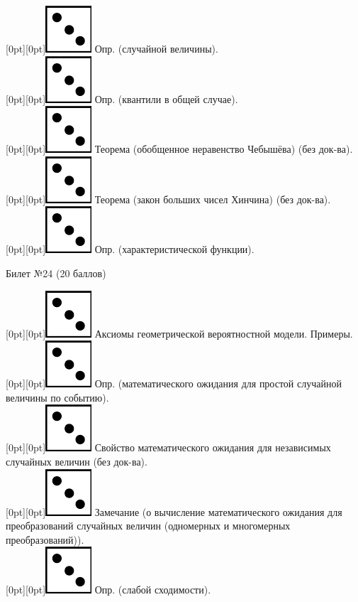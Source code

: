 \documentclass[10pt]{article}
\begin{document}
\raisebox{-1pt}[0pt][0pt]{\includegraphics[width=0.02\linewidth]{3.png}} Опр. (случайной величины). \\ 
\raisebox{-1pt}[0pt][0pt]{\includegraphics[width=0.02\linewidth]{3.png}}   Опр. (квантили в общей случае). \\
\raisebox{-1pt}[0pt][0pt]{\includegraphics[width=0.02\linewidth]{3.png}} Теорема (обобщенное неравенство Чебышёва) (без док-ва). \\
\raisebox{-1pt}[0pt][0pt]{\includegraphics[width=0.02\linewidth]{3.png}} Теорема (закон больших чисел Хинчина) (без док-ва). \\
\raisebox{-1pt}[0pt][0pt]{\includegraphics[width=0.02\linewidth]{3.png}} Опр. (характеристической функции). \\
\begin{center} {\Large Билет №24 (20 баллов)} \end{center}
\raisebox{-1pt}[0pt][0pt]{\includegraphics[width=0.02\linewidth]{3.png}} Аксиомы геометрической вероятностной модели. Примеры. \\
\raisebox{-1pt}[0pt][0pt]{\includegraphics[width=0.02\linewidth]{3.png}} Опр. (математического ожидания для простой случайной величины по событию). \\
\raisebox{-1pt}[0pt][0pt]{\includegraphics[width=0.02\linewidth]{3.png}} Свойство  математического ожидания для независимых случайных величин (без док-ва). \\
\raisebox{-1pt}[0pt][0pt]{\includegraphics[width=0.02\linewidth]{3.png}} Замечание (о вычисление  математического ожидания для преобразований случайных величин (одномерных и многомерных преобразований)). \\
\raisebox{-1pt}[0pt][0pt]{\includegraphics[width=0.02\linewidth]{3.png}} Опр. (слабой сходимости). \\
\end{document}
